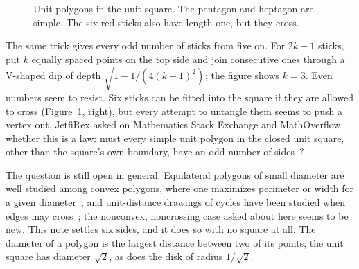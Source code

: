 \documentclass[11pt]{article}
\theoremstyle{remark}
\begin{document}
\begin{figure}[ht]
\centering
{}
\caption{Unit polygons in the unit square. The pentagon and heptagon are simple. The six
red sticks also have length one, but they cross.}
\label{fig:examples}
\end{figure}

The same trick gives every odd number of sticks from five on. For $2k+1$ sticks, put
$k$ equally spaced points on the top side and join consecutive ones through a
V-shaped dip of depth $\sqrt{1-1/(4(k-1)^2)}$; the figure shows $k=3$. Even numbers
seem to resist. Six sticks can be fitted into the square if they are allowed to cross
(Figure~\ref{fig:examples}, right), but every attempt to untangle them seems to push a
vertex out. JetfiRex asked on Mathematics Stack Exchange and MathOverflow whether this
is a law: must every simple unit polygon in the closed unit square, other than the
square's own boundary, have an odd number of sides~\cite{JetfiRexMSE,JetfiRexMO}?

The question is still open in general. Equilateral polygons of small diameter are well
studied among convex polygons, where one maximizes perimeter or width for a given
diameter~\cite{BinganeAudet}, and unit-distance drawings of cycles have been studied when
edges may cross~\cite{GMU}; the nonconvex, noncrossing case asked about here seems to be new.
This note settles six sides, and it does so with no square at all. The diameter of a polygon is the largest distance between two of its
points; the unit square has diameter $\sqrt2$, as does the disk of radius $1/\sqrt2$.
\end{document}
